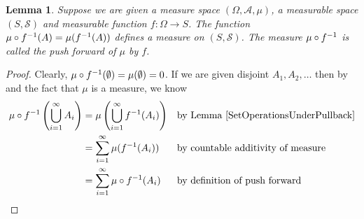 \documentclass{amsart}
\newtheorem{lem}[thm]{Lemma}
\theoremstyle{remark}
\theoremstyle{definition}
\begin{document}
\begin{lem}\label{PushforwardMeasure}Suppose we are given a measure space $(\Omega, \mathcal{A},
  \mu)$, a measurable space $(S, \mathcal{S})$ and measurable
  function $f : \Omega \to S$.  The function $\mu \circ f^{-1} (A) =
  \mu(f^{-1}(A))$ defines a measure on $(S, \mathcal{S})$.  The
  measure $\mu \circ f^{-1}$ is called the \emph{push forward} of
  $\mu$ by $f$.
\end{lem}
\begin{proof}Clearly, $\mu \circ f^{-1} (\emptyset) = \mu(\emptyset) =
  0$.  
If we are given disjoint $A_1, A_2, \dots$ then by and the fact that $\mu$ is a measure,
we know 
\begin{align*}
\mu \circ f^{-1} \left (\bigcup_{i=1}^\infty A_i \right ) & =
\mu \left (\bigcup_{i=1}^\infty f^{-1}(A_i) \right ) & & \text{by Lemma
\ref{SetOperationsUnderPullback}} \\
& = \sum_{i=1}^\infty \mu (f^{-1}(A_i)) & & \text{by countable
  additivity of measure}\\
&=  \sum_{i=1}^\infty \mu \circ f^{-1} (A_i) & & \text{by
  definition of push forward}
\end{align*}
\end{proof}
\end{document}
